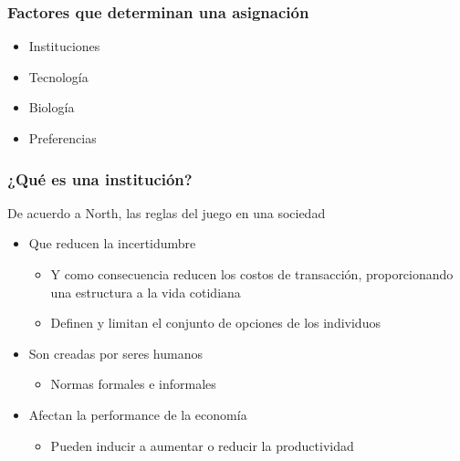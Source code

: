 \documentclass{beamer}
\begin{document}
\begin{frame}
\frametitle{Factores que determinan una asignación}
\begin{itemize}
    \item  \textcolor{Azul}{Instituciones}
    \item Tecnología
    \item Biología
    \item Preferencias
\end{itemize} 
\end{frame}

\begin{frame}
\frametitle{¿Qué es una institución?}
De acuerdo a North, las reglas del juego en una sociedad
    \begin{itemize}
    \item Que reducen la incertidumbre
    \begin{itemize}
        \item Y como consecuencia reducen los costos de transacción, proporcionando una estructura a la vida cotidiana
        \item Definen y limitan el conjunto de opciones de los individuos
    \end{itemize}
    \item Son creadas por seres humanos
        \begin{itemize}
        \item Normas formales e informales
        \end{itemize} 
    \item Afectan la performance de la economía
        \begin{itemize}
        \item Pueden inducir a aumentar o reducir la productividad
        \end{itemize} 
\end{itemize} 
\end{frame}
\end{document}

